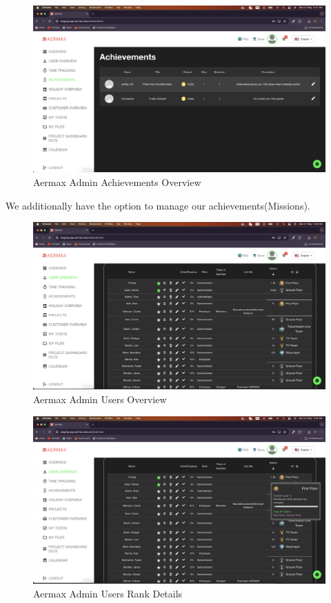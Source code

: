 \begin{figure}[H]
  \centering
  \includegraphics[width=1\textwidth]{src/assets/chapters/adminAchievements.png}
  \caption{Aermax Admin Achievements Overview}
  \label{fig:admin-achievements-overview}
\end{figure}

We additionally have the option to manage our achievements(Missions).


\begin{figure}[H]
  \centering
  \includegraphics[width=1\textwidth]{src/assets/chapters/adminUsers.png}
  \caption{Aermax Admin Users Overview}
  \label{fig:admin-users-overview}
\end{figure}

\begin{figure}[H]
  \centering
  \includegraphics[width=1\textwidth]{src/assets/chapters/adminuserswithrankdetails.png}
  \caption{Aermax Admin Users Rank Details}
  \label{fig:admin-users-ranks}
\end{figure}

